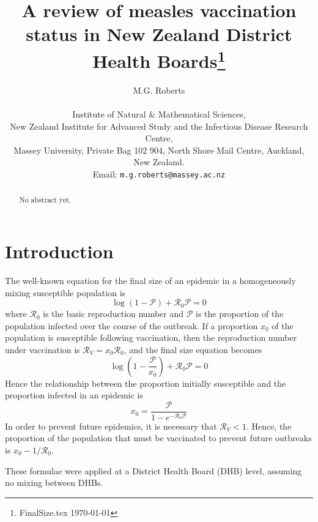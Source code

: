 \documentclass[11pt,a4paper]{article}
\newcommand{\Pe}{\mathcal{P}}
\newcommand{\Ro}{\mathcal{R}_0}
\newcommand{\Rr}{\mathcal{R}}
\begin{document}
\title{A review of measles vaccination status in New Zealand District Health Boards\footnote{FinalSize.tex \today}}
\author{M.G. Roberts \\\\
{\small Institute of Natural \& Mathematical Sciences,}\\
{\small   New Zealand Institute for Advanced Study and the Infectious Disease Research Centre,}\\
{\small   Massey University, Private Bag 102 904, North Shore Mail Centre, Auckland, New Zealand. } \\ 
Email: \texttt{m.g.roberts@massey.ac.nz}}
\date{}
\maketitle

\thispagestyle{empty}
 
\begin{abstract}

No abstract yet. 

\end{abstract}

\newpage


\section{Introduction}

The well-known equation for the final size of an epidemic in a homogeneously mixing susceptible population is \cite{DHB}
$$\log\left(1-\Pe\right)+\Ro\Pe=0$$
where $\Ro$ is the basic reproduction number and $\Pe$ is the proportion of the population infected over the course of the outbreak.
If a proportion $x_0$ of the population is susceptible following vaccination, then the  reproduction number under vaccination is $\Rr_V=x_0\Ro$, and the final size equation becomes
$$\log\left(1-\frac{\Pe}{x_0}\right)+\Ro\Pe=0$$
Hence the relationship between the proportion initially susceptible and the proportion infected in an epidemic is
$$x_0=\frac{\Pe}{1-e^{-\Ro\Pe}}$$
In order to prevent future epidemics, it is necessary that $\Rr_V<1$. Hence, the proportion of the population that must be vaccinated to prevent future outbreaks is $x_0-1/\Ro$.

These formulae were applied at a District Health Board (DHB) level, assuming no mixing between DHBs.
\end{document}
